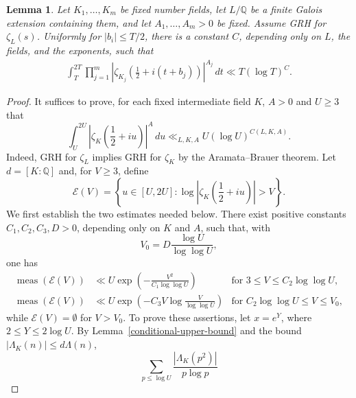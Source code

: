 \documentclass[10pt,a4paper]{amsart}
\newtheorem{lem}{Lemma}
\renewcommand{\ge}{\geqslant}
\renewcommand{\le}{\leqslant}
\begin{document}
\begin{lem}\label{shifted-moment-trivial-bound}
Let $K_1,\ldots,K_m$ be fixed number fields, let $L/\mathbb Q$ be a finite Galois extension containing them, and let $A_1,\ldots,A_m>0$ be fixed.  Assume GRH for $\zeta_L(s)$.  Uniformly for $|b_i|\le T/2$, there is a constant $C$, depending only on $L$, the fields, and the exponents, such that
		\begin{align*}
			\int_{T}^{2T} \prod_{j=1}^{m}\left| \zeta_{K_j}\left(\frac{1}{2}+i(t+b_j)\right)\right|^{A_j}\,dt\ll T(\log T)^C.
		\end{align*}
	\end{lem}

	\begin{proof}
It suffices to prove, for each fixed intermediate field $K$,  $A>0$ and $U\ge 3$ that
\begin{equation}\label{eq:one-field-crude-moment}
\int_U^{2U}\left|\zeta_K\left(\frac12+iu\right)\right|^A\,du
        \ll_{L,K,A} U(\log U)^{C(L,K,A)}.
\end{equation}
Indeed, GRH for $\zeta_L$ implies GRH for $\zeta_K$ by the Aramata--Brauer theorem.  Let $d=[K:\mathbb Q]$ and, for $V\ge3$, define
\begin{equation*}
        \mathcal E(V)=
        \left\{u\in[U,2U]:
        \log\left|\zeta_K\left(\frac12+iu\right)\right|>V\right\}.
\end{equation*}
We first establish the two estimates needed below.  There exist positive constants $C_1,C_2,C_3,D>0$, depending only on $K$ and $A$, such that, with
\begin{equation*}
        V_0=D\frac{\log U}{\log\log U},
\end{equation*}
one has
\begin{align}
\label{eq:dedekind-large-values-small}
        \operatorname{meas}(\mathcal E(V))
        &\ll
        U\exp\left(-\frac{V^2}{C_1\log\log U}\right)
         &\text{for }3\le  V\le  C_2\log\log U,\\
\label{eq:dedekind-large-values-large}
        \operatorname{meas}(\mathcal E(V))
        &\ll
        U\exp\left(-C_3V\log\frac{V}{\log\log U}\right)
        &\text{for }C_2\log\log U\le V\le V_0,
\end{align}
while $\mathcal E(V)=\emptyset$ for $V>V_0$.  To prove these assertions, let $x=e^Y$, where $2\le Y\le2\log U$.  By Lemma~\ref{conditional-upper-bound} and the bound $|\Lambda_K(n)|\le d\Lambda(n)$,
\begin{equation*}
        \sum_{p\le  \log U}\frac{|\Lambda_K(p^2)|}{p\log p}

\end{equation*}
\end{proof}
\end{document}
